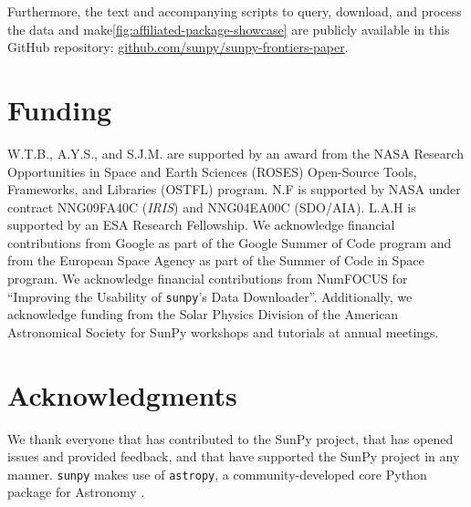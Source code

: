 \documentclass[utf8]{FrontiersinHarvard}
\newcommand{\package}[1]{\texttt{#1}\xspace}
\newcommand{\github}{GitHub\xspace}
\newcommand{\sunpy}{SunPy\xspace}
\newcommand{\sunpyproj}{SunPy project\xspace}
\newcommand{\sunpypkg}{\package{sunpy}}
\newcommand{\astropypkg}{\package{astropy}}
\begin{document}
Furthermore, the text and accompanying scripts to query, download, and process the data and make\autoref{fig:affiliated-package-showcase} are publicly available in this \github repository: \href{#}{github.com/sunpy/sunpy-frontiers-paper}.

\section*{Funding}
\label{sec:funding}

W.T.B., A.Y.S., and S.J.M. are supported by an award from the NASA Research Opportunities in Space and Earth Sciences (ROSES) Open-Source Tools, Frameworks, and Libraries (OSTFL) program.
N.F is supported by NASA under contract NNG09FA40C ({\it IRIS}) and NNG04EA00C (SDO/AIA).
L.A.H is supported by an ESA Research Fellowship.
We acknowledge financial contributions from Google as part of the Google Summer of Code program and from the European Space Agency as part of the Summer of Code in Space program.
We acknowledge financial contributions from NumFOCUS for \enquote{Improving the Usability of \sunpypkg's Data Downloader}.
Additionally, we acknowledge funding from the Solar Physics Division of the American Astronomical Society for \sunpy workshops and tutorials at annual meetings.

\section*{Acknowledgments}
\label{sec:acknowledgments}

We thank everyone that has contributed to the \sunpyproj, that has opened issues and provided feedback, and that have supported the \sunpyproj in any manner.
\sunpypkg makes use of \astropypkg, a community-developed core Python package for Astronomy \citep{astropy_collaboration_astropy_2022}.



\end{document}
